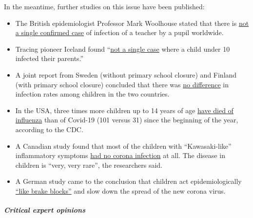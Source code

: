 In the meantime, further studies on this issue have been published:

\begin{itemize}
\tightlist
\item
  The British epidemiologist Professor Mark Woolhouse stated that there
  is
  \href{https://www.thetimes.co.uk/article/no-known-case-of-teacher-catching-coronavirus-from-pupils-says-scientist-3zk5g2x6z}{not
  a single confirmed case} of infection of a teacher by a pupil
  worldwide.
\item
  Tracing pioneer Iceland found
  ``\href{https://www.sciencemuseumgroup.org.uk/blog/hunting-down-covid-19/}{not
  a single case} where a child under 10 infected their parents.''
\item
  A joint report from Sweden (without primary school closure) and
  Finland (with primary school closure) concluded that there was
  \href{https://www.reuters.com/article/us-health-coronavirus-sweden-schools-idUSKCN24G2IS}{no
  difference} in infection rates among children in the two countries.
\item
  In the USA, three times more children up to 14 years of age
  \href{https://childrenshealthdefense.org/news/if-covid-fatalities-were-90-2-lower-how-would-you-feel-about-schools-reopening/}{have
  died of influenza} than of Covid-19 (101 versus 31) since the
  beginning of the year, according to the CDC.
\item
  A Canadian study found that most of the children with
  ``Kawasaki-like'' inflammatory symptoms
  \href{https://www.theglobeandmail.com/canada/article-new-syndrome-in-children-thought-to-be-linked-to-covid-19-yields/}{had
  no corona infection} at all. The disease in children is ``very, very
  rare'', the researchers said.
\item
  A German study came to the conclusion that children act
  epidemiologically
  \href{https://www.faz.net/aktuell/politik/inland/corona-studie-an-schulen-kinder-eher-bremskloetze-der-infektion-16858827.html}{``like
  brake blocks''} and slow down the spread of the new corona virus.
\end{itemize}

\hypertarget{critical-expert-opinions}{%
\subparagraph{\texorpdfstring{\textbf{Critical expert
opinions}}{Critical expert opinions}}\label{critical-expert-opinions}}

